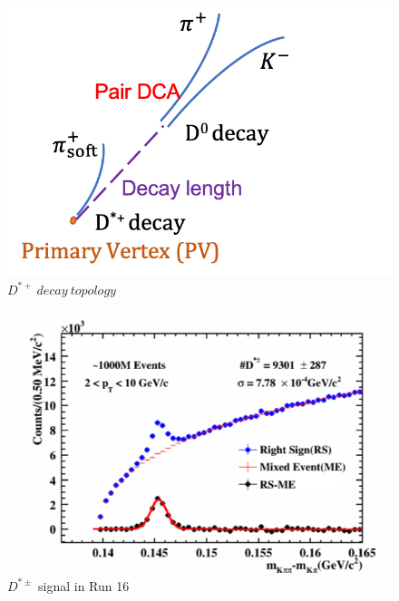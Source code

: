 	\begin{figure}[h!]
		\centering
		\includegraphics[scale=0.6]{dstarplots/decayTopo.png}
		\caption{$D^{*+}~decay~topology$}
		\label{fig:decayTopo}
	\end{figure}
	
		\begin{figure}[h!]
		\centering
		\includegraphics[scale=1]{dstarplots/sig16.png}
		\caption{$D^{*\pm}$ signal in Run 16}
		\label{fig:sig16}
	\end{figure}

